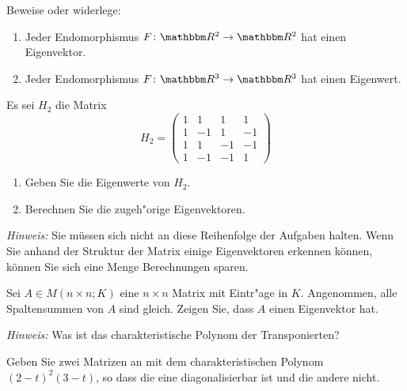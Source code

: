 \documentclass[a4,11pt]{article}
\begin{document}
\vspace*{-17mm}
{
\kopf
}


\begin{aufgabe}[4 Punkte]
  Beweise oder widerlege:
  \begin{enumerate}
  \item Jeder Endomorphismus $F \colon \R^2 \to \R^2$ hat einen
    Eigenvektor.
  \item Jeder Endomorphismus $F \colon \R^3 \to \R^3$ hat einen
    Eigenwert.
  \end{enumerate}
\end{aufgabe}

\begin{aufgabe}[4 Punkte]
Es sei $H_2$ die Matrix
\[
H_2 = \begin{pmatrix}
1 & 1 & 1 & 1\\
1 & -1 & 1 & -1\\
1 & 1 & -1 & -1\\
1 & -1 & -1 & 1
\end{pmatrix}
\]
\begin{enumerate}
\item Geben Sie die Eigenwerte von $H_2$.
\item Berechnen Sie die zugeh"orige Eigenvektoren.
\end{enumerate}

\emph{Hinweis:} Sie müssen sich nicht an diese Reihenfolge der Aufgaben halten. Wenn Sie anhand der Struktur der Matrix einige Eigenvektoren erkennen können, können Sie sich eine Menge Berechnungen sparen.
\end{aufgabe}

\begin{aufgabe}[4 Punkte]
Sei $A \in M(n \times n ; K)$ eine $n \times n$ Matrix mit Eintr"age in $K$.
Angenommen,  alle Spaltensummen von $A$ sind gleich.
Zeigen Sie, dass  $A$ einen Eigenvektor hat.

\emph{Hinweis:} Was ist das charakteristische Polynom der
Transponierten?
\end{aufgabe}

\begin{aufgabe}[4 Punkte]
  Geben Sie zwei Matrizen an mit dem charakteristischen Polynom
  $(2-t)^2(3-t)$, so dass die eine diagonalisierbar ist und die andere
  nicht.
\end{aufgabe}
\end{document}

